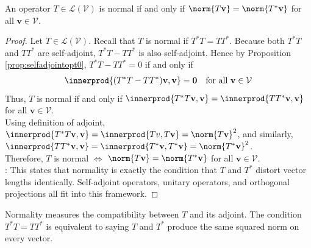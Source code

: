 \begin{proposition} \label{prop:nullTeqnullTselfadjt} An operator $T \in \mathcal{L}(\mathcal{V})$ is normal if and only if $\norm{T \mathbf{v}} = \norm{T^* \mathbf{v}}$ for all $\mathbf{v} \in \mathcal{V}$.
\begin{proof} Let $T \in \mathcal{L}(\mathcal{V})$. Recall that $T$ is normal if $T^* T = TT^*$. Because both $T^* T$ and $TT^*$ are self-adjoint, $T^* T - TT^*$ is also self-adjoint. Hence by Proposition \ref{prop:selfadjointopt0}, $T^*T - TT^* = 0$ if and only if
\begin{align}
\innerprod{(T^*T - TT^*)\mathbf{v}, \mathbf{v}} = \mathbf{0} \ \ \ \text{for all } \mathbf{v} \in \mathcal{V} \nonumber
\end{align}
Thus, $T$ is normal if and only if $\innerprod{T^* T \mathbf{v}, \mathbf{v}} = \innerprod{T T^* \mathbf{v}, \mathbf{v}}$ for all $\mathbf{v} \in \mathcal{V}$.\\
Using definition of adjoint, $\innerprod{T^* T \mathbf{v}, \mathbf{v}} = \innerprod{T v, T \mathbf{v}} = \norm{T \mathbf{v}}^2$, and similarly, $\innerprod{T T^* \mathbf{v}, \mathbf{v}} = \innerprod{T^* \mathbf{v}, T^* \mathbf{v}} = \norm{T^* \mathbf{v}}^2$.\\
Therefore, $T$ is normal $\Leftrightarrow$ $\norm{T \mathbf{v}} = \norm{T^* \mathbf{v}}$ for all $\mathbf{v} \in \mathcal{V}$.\\
: This states that normality is exactly the condition that $T$ and $T^*$ distort vector lengths identically. Self-adjoint operators, unitary operators, and orthogonal projections all fit into this framework. 
\end{proof}
\end{proposition}

Normality measures the compatibility between $T$ and its adjoint. The condition $T^* T = T T^*$ is equivalent to saying $T$ and $T^*$ produce the same squared norm on every vector.

